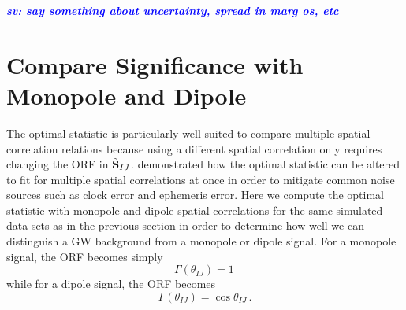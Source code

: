\documentclass[twocolumn,aps,prd,superscriptaddress]{revtex4-1}
\newcommand{\sv}[1]{\textcolor{blue}{\it{\textbf{sv: #1}}} }
\begin{document}
\sv{say something about uncertainty, spread in marg os, etc}


\section{Compare Significance with Monopole and Dipole}
\label{sec:spatial}

The optimal statistic is particularly well-suited to compare multiple spatial correlation relations 
because using a different spatial correlation only requires changing the ORF 
in $\tilde{{\bf{S}}}_{IJ}$. 
\citet{thk+2016} demonstrated how the optimal statistic can be altered to fit for 
multiple spatial correlations at once in order to mitigate common noise sources such as 
clock error and ephemeris error. 
Here we compute the optimal statistic with monopole and dipole spatial correlations 
for the same simulated data sets as in the previous section in order to determine 
how well we can distinguish a GW background from a monopole or dipole signal. 
For a monopole signal, the ORF becomes simply
\[ \Gamma(\theta_{IJ}) = 1 \,\]
while for a dipole signal, the ORF becomes
\[ \Gamma(\theta_{IJ}) = \cos\theta_{IJ} \,. \]
\end{document}
